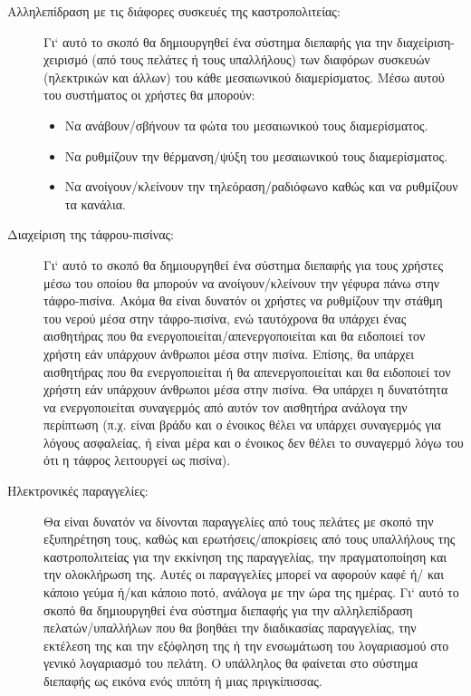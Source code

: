 \documentclass{assignment}
\begin{document}
\begin {description}

\item[Αλληλεπίδραση με τις διάφορες συσκευές της καστροπολιτείας:] Γι` αυτό το σκοπό θα δημιουργηθεί ένα σύστημα διεπαφής για την διαχείριση-χειρισμό (από τους πελάτες ή τους υπαλλήλους) των διαφόρων συσκευών (ηλεκτρικών και άλλων) του κάθε μεσαιωνικού διαμερίσματος. Μέσω αυτού του συστήματος οι χρήστες θα μπορούν:

  \begin{itemize}
  \item Να ανάβουν/σβήνουν τα φώτα του μεσαιωνικού τους διαμερίσματος.
  \item Να ρυθμίζουν την θέρμανση/ψύξη του μεσαιωνικού τους διαμερίσματος.
  \item Να ανοίγουν/κλείνουν την τηλεόραση/ραδιόφωνο καθώς και να ρυθμίζουν τα κανάλια.
  \end{itemize}

\item[Διαχείριση της τάφρου-πισίνας:] Γι` αυτό το σκοπό θα δημιουργηθεί ένα σύστημα διεπαφής για τους χρήστες μέσω του οποίου θα μπορούν να ανοίγουν/κλείνουν την γέφυρα πάνω στην τάφρο-πισίνα. Ακόμα θα είναι δυνατόν οι χρήστες να ρυθμίζουν την στάθμη του νερού μέσα στην τάφρο-πισίνα, ενώ ταυτόχρονα θα υπάρχει ένας αισθητήρας που θα ενεργοποιείται/απενεργοποιείται και θα ειδοποιεί τον χρήστη εάν υπάρχουν άνθρωποι μέσα στην πισίνα. Επίσης, θα υπάρχει αισθητήρας που θα ενεργοποιείται ή θα απενεργοποιείται και θα ειδοποιεί τον χρήστη εάν υπάρχουν άνθρωποι μέσα στην πισίνα. Θα υπάρχει η δυνατότητα να ενεργοποιείται συναγερμός από αυτόν τον αισθητήρα ανάλογα την περίπτωση (π.χ. είναι βράδυ και ο ένοικος θέλει να υπάρχει συναγερμός για λόγους ασφαλείας, ή είναι μέρα και ο ένοικος δεν θέλει το συναγερμό λόγω του ότι η τάφρος λειτουργεί ως πισίνα).

\item[Ηλεκτρονικές παραγγελίες:] Θα είναι δυνατόν να δίνονται παραγγελίες από τους πελάτες με σκοπό την εξυπηρέτηση τους, καθώς και ερωτήσεις/αποκρίσεις από τους υπαλλήλους της καστροπολιτείας για την εκκίνηση της παραγγελίας, την πραγματοποίηση και την ολοκλήρωση της. Αυτές οι παραγγελίες μπορεί να αφορούν καφέ ή/ και κάποιο γεύμα ή/και κάποιο ποτό, ανάλογα με την ώρα της ημέρας. Γι` αυτό το σκοπό θα δημιουργηθεί ένα σύστημα διεπαφής για την αλληλεπίδραση πελατών/υπαλλήλων που θα βοηθάει την διαδικασίας παραγγελίας, την εκτέλεση της και την εξόφληση της ή την ενσωμάτωση του λογαριασμού στο γενικό λογαριασμό του πελάτη. Ο υπάλληλος θα φαίνεται στο σύστημα διεπαφής ως εικόνα ενός ιππότη ή μιας πριγκίπισσας. 

\end{description}
\end{document}
